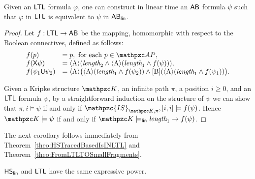 \begin{theorem}\label{theo:FromLTLTOSmallFragments} Given an $\text{\sffamily LTL}$ formula $\varphi$, one can construct in linear time an $\mathsf{AB}$  formula $\psi$ such that $\varphi$ in $\text{\sffamily LTL}$ is equivalent to $\psi$ in $\mathsf{AB}_{\mathsf{lin}}$.
\end{theorem}
\begin{proof}
Let $f: \text{\sffamily LTL} \to \mathsf{AB}$ be the mapping, homomorphic with respect to the Boolean connectives, defined as follows:  
\[\begin{array}{ll}
f(p) & = p, \text{ for each } p\in\Prop,\\
f(\Next\psi) & = \hsA (\Length_{2}\wedge \hsA(\Length_1\wedge f(\psi))),\\
f(\psi_1\until\psi_2) & = \hsA \bigl(\hsA(\Length_{1}\wedge f(\psi_2))\wedge\hsBu(\hsA(\Length_{1}\wedge f(\psi_1))\bigr).
\end{array}\]

Given a Kripke structure $\Ku$, an infinite path $\pi$, a position $i\geq 0$, and an $\text{\sffamily LTL}$ formula $\psi$, by a straightforward induction on the structure of
$\psi$ we can show that $\pi,i\models \psi$ if and only if
$\mathpzc{IS}_{\Ku,\pi},[i,i]\models f(\psi)$.
Hence $\Ku\models \psi$ if and only if $\Ku\models_\LinearTime \Length_1\rightarrow f(\psi)$.
\end{proof}

The next corollary follows immediately from Theorem~\ref{theo:HSTracedBasedIsINLTL} and Theorem~\ref{theo:FromLTLTOSmallFragments}.
\begin{corollary}\label{cor:HSLinearCharacterization} $\text{\sffamily HS}_{\mathsf{lin}}$ and $\text{\sffamily LTL}$ have the same expressive power.
\end{corollary}


